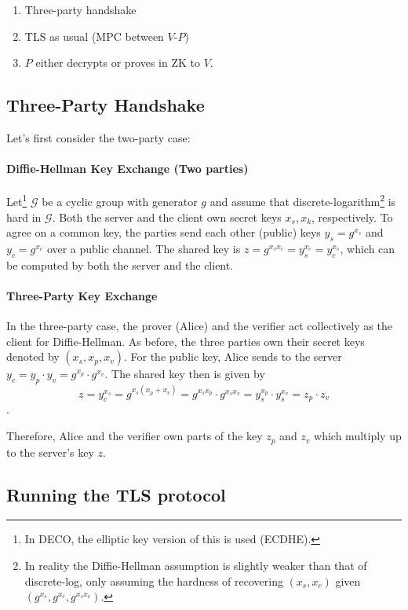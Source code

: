 \documentclass[twoside]{article}
\begin{document}
	\begin{enumerate}
		\item Three-party handshake
		\item TLS as usual (MPC between $V$-$P$)
		\item $P$ either decrypts or proves in ZK to $V$.
	\end{enumerate}
	
	\subsection{Three-Party Handshake}
	Let's first consider the two-party case:
	
	\paragraph{Diffie-Hellman Key Exchange (Two parties)}
	Let\footnote{In DECO, the elliptic key version of this is used (ECDHE).} $\mathcal{G}$ be a cyclic group with generator $g$ and assume that discrete-logarithm\footnote{In reality the Diffie-Hellman assumption is slightly weaker than that of discrete-log, only assuming the hardness of recovering $(x_s,x_c)$ given $(g^{x_s}, g^{x_c}, g^{x_sx_c})$.} is hard in $\mathcal{G}$. Both the server and the client own secret keys $x_s, x_k$, respectively. To agree on a common key, the parties send each other (public) keys $y_s = g^{x_s}$ and $y_c = g^{x_c}$ over a public channel. The shared key is $z = g^{x_sx_c} = y_s^{x_c} = y_c^{x_s}$, which can be computed by both the server and the client.
	
	\paragraph{Three-Party Key Exchange}
	In the three-party case, the prover (Alice) and the verifier act collectively as the client for Diffie-Hellman. As before, the three parties own their secret keys denoted by $(x_s, x_p, x_v)$. For the public key, Alice sends to the server $y_c = y_p\cdot y_v = g^{x_p} \cdot g^{x_v}$. The shared key then is given by $$z = y_c^{x_s} = g^{x_s(x_p + x_v)} = g^{x_sx_p} \cdot g^{x_sx_v} = y_s^{x_p}\cdot y_s^{x_v} = z_p \cdot z_v$$. 
	
	Therefore, Alice and the verifier own parts of the key $z_p$ and $z_v$ which multiply up to the server's key $z$.
	
	\subsection{Running the TLS protocol}
	
\end{document}
